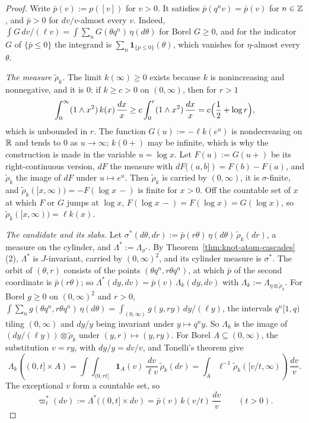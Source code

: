 \begin{proof}
\leanok
{}
Write $\bar p(v) := p([v])$ for $v > 0$. It satisfies $\bar p(q^nv) = \bar p(v)$ for $n \in \mathbb{Z}$,
and $\bar p > 0$ for $dv/v$-almost every $v$. Indeed, $\int G\,dv/(\ell v) =
\int\sum_nG(\theta q^n)\,\eta(d\theta)$ for Borel $G \ge 0$, and for the indicator $G$ of
$\{\bar p \le 0\}$ the integrand is $\sum_n\mathbf 1_{\{p \le 0\}}(\theta)$, which vanishes for
$\eta$-almost every $\theta$.

\emph{The measure $\tilde\rho_k$.} The limit $k(\infty) \ge 0$ exists because $k$ is
nonincreasing and nonnegative, and it is $0$: if $k \ge c > 0$ on $(0,\infty)$, then for $r > 1$
\[
  \int_0^\infty(1 \wedge x^2)\,k(x)\,\frac{dx}{x} \ge c\int_0^r(1 \wedge x^2)\,\frac{dx}{x}
  = c\Bigl(\frac12 + \log r\Bigr),
\]
which is unbounded in $r$. The function $G(u) := -\ell k(e^u)$ is nondecreasing on $\mathbb{R}$ and tends
to $0$ as $u \to \infty$; $k(0{+})$ may be infinite, which is why the construction is made in the
variable $u = \log x$. Let $F(u) := G(u{+})$ be its right-continuous version, $dF$ the measure with
$dF((a,b]) = F(b) - F(a)$, and $\tilde\rho_k$ the image of $dF$ under $u \mapsto e^u$. Then
$\tilde\rho_k$ is carried by $(0,\infty)$, it is $\sigma$-finite, and
$\tilde\rho_k([x,\infty)) = -F(\log x\,{-})$ is finite for $x > 0$. Off the countable set of $x$
at which $F$ or $G$ jumps at $\log x$, $F(\log x\,{-}) = F(\log x) = G(\log x)$, so
$\tilde\rho_k([x,\infty)) = \ell k(x)$.

\emph{The candidate and its slabs.} Let $\sigma^*(d\theta, dr) := \bar p(r\theta)\,\eta(d\theta)\,
\tilde\rho_k(dr)$, a measure on the cylinder, and $\Lambda^* := \Lambda_{\sigma^*}$. By
Theorem~\ref{thm:knot-atom-cascades}(2), $\Lambda^*$ is $J$-invariant, carried by $(0,\infty)^2$,
and its cylinder measure is $\sigma^*$. The orbit of $(\theta, r)$ consists of the points
$(\theta q^n, r\theta q^n)$, at which $\bar p$ of the second coordinate is $\bar p(r\theta)$; so
$\Lambda^*(dy, dv) = \bar p(v)\,\Lambda_k(dy, dv)$ with $\Lambda_k := \Lambda_{\eta \otimes
\tilde\rho_k}$. For Borel $g \ge 0$ on $(0,\infty)^2$ and $r > 0$,
$\int\sum_ng(\theta q^n, r\theta q^n)\,\eta(d\theta) = \int_{(0,\infty)}g(y, ry)\,dy/(\ell y)$, the
intervals $q^n[1,q)$ tiling $(0,\infty)$ and $dy/y$ being invariant under $y \mapsto q^ny$. So
$\Lambda_k$ is the image of $(dy/(\ell y)) \otimes \tilde\rho_k$ under $(y, r) \mapsto (y, ry)$.
For Borel $A \subseteq (0,\infty)$, the substitution $v = ry$, with $dy/y = dv/v$, and Tonelli's
theorem give
\[
  \Lambda_k((0,t] \times A) = \int\int_{(0,rt]}\mathbf 1_A(v)\,\frac{dv}{\ell v}\,\tilde\rho_k(dr)
  = \int_A\ell^{-1}\tilde\rho_k([v/t,\infty))\,\frac{dv}{v} .
\]
The exceptional $v$ form a countable set, so
\[
  \varpi^*_t(dv) := \Lambda^*((0,t] \times dv) = \bar p(v)\,k(v/t)\,\frac{dv}{v} \qquad (t > 0).
\]


\end{proof}

